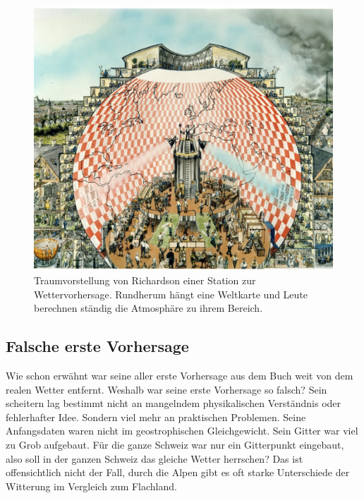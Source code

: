 \begin{figure}
	\centering
	\includegraphics{Richardsons_Traum.jpg}
	\caption{Traumvorstellung von Richardson einer Station zur Wettervorhersage. 
	Rundherum hängt eine Weltkarte und Leute berechnen ständig die Atmosphäre zu ihrem Bereich.}
	\label{bild:richardsonsTraum}
\end{figure}

\subsection{Falsche erste Vorhersage}

Wie schon erwähnt war seine aller erste Vorhersage aus dem Buch \cite{geostrophisch:wpbnp} weit von dem realen Wetter entfernt.
Weshalb war seine erste Vorhersage so falsch? 
Sein scheitern lag bestimmt nicht an mangelndem physikalischen Verständnis oder fehlerhafter Idee. 
Sondern viel mehr an praktischen Problemen.
Seine Anfangsdaten waren nicht im geostrophischen Gleichgewicht. 
Sein Gitter war viel zu Grob aufgebaut. 
Für die ganze Schweiz war nur ein Gitterpunkt eingebaut, also soll in der ganzen Schweiz das gleiche Wetter herrschen? 
Das ist offensichtlich nicht der Fall, durch die Alpen gibt es oft starke Unterschiede der Witterung im Vergleich zum Flachland.
 



